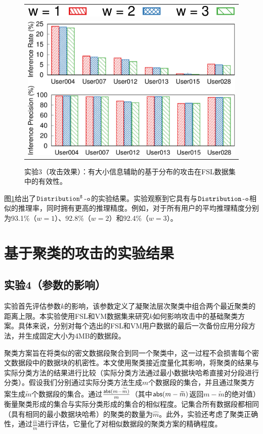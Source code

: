 \begin{figure}[!htbp]
    \centering
    \centering
    \begin{tabular}{c}
        \includegraphics[width=.35\textwidth]{pic/legend-effectiveness.pdf}\\
        \includegraphics[width=.7\textwidth]{pic/distribution-effectiveness-w-size.pdf}
    \end{tabular}
	\caption{实验3（攻击效果）：有大小信息辅助的基于分布的攻击在FSL数据集中的有效性。}
	\label{fig:experiment-distribution-effectiveness-w}
\end{figure}

图\ref{fig:experiment-distribution-effectiveness-w}给出了$\tt Distribution^S$-$\tt o$的实验结果。实验观察到它具有与$\tt Distribution$-$\tt o$相似的推理率，同时拥有更高的推理精度。例如，对于所有用户的平均推理精度分别为93.1\%（$w = 1$）、92.8\%（$w = 2$）和92.4\%（$w = 3$）。         

\section{基于聚类的攻击的实验结果}
\label{sec:experiment-clustering}

\subsection{实验4（参数的影响）} 
\label{sec:exp4}
实验首先评估参数$k$的影响，该参数定义了凝聚法层次聚类中组合两个最近聚类的距离上限。本实验使用FSL和VM数据集来研究$k$如何影响攻击中的基础聚类方案。具体来说，分别对每个选出的FSL和VM用户数据的最后一次备份应用分段方法，并生成固定大小为4MB的数据段。

聚类方案旨在将类似的密文数据段聚合到同一个聚类中，这一过程不会损害每个密文数据段中的数据块的机密性。本文使用聚类接近度量化其影响，将聚类的结果与实际分类方法的结果进行比较（实际分类方法通过最小数据块哈希直接对分段进行分类）。假设我们分别通过实际分类方法生成$m$个数据段的集合，并且通过聚类方案生成$\widetilde{m}$个数据段的集合。通过$\frac{{\sf abs}(m-\widetilde{m})}{m}$（其中${\sf abs}(m-\widetilde{m})$返回$m-\widetilde{m}$的绝对值）衡量聚类形成的集合与实际分类形成的集合的相似程度。记集合所有数据段都相同（具有相同的最小数据块哈希）的聚类的数量为$\hat{m}$。此外，实验还考虑了聚类正确性，通过$\frac{\hat{m}}{\widetilde{m}}$进行评估，它量化了对相似数据段的聚类方案的精确程度。

